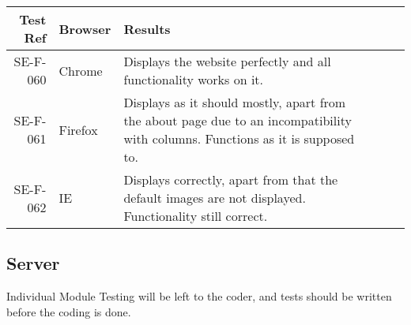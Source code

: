 \begin{landscape}
\begin{longtable}{|r|l|p{4cm}|p{4cm}|p{4cm}|p{4cm}|}
		\hline
		Test Ref & Browser & Results\\ \hline
SE-F-060 & Chrome & Displays the website perfectly and all functionality works on it.\\ \hline
		
SE-F-061 & Firefox & Displays as it should mostly, apart from the about page due to an incompatibility with columns. Functions as it is supposed to. \\ \hline

SE-F-062 & IE  & Displays correctly, apart from that the default images are not displayed. Functionality still correct. \\ \hline
	
\end{longtable}
	\end{landscape}

\subsection{Server}
	Individual Module Testing will be left to the coder, and tests should be written before the coding is done.

